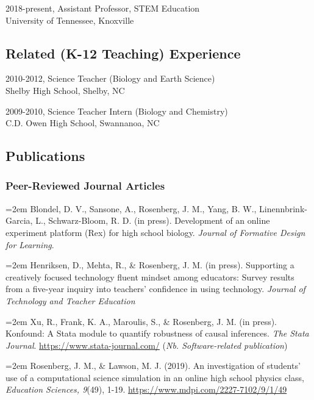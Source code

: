 \documentclass[14,]{article}
\begin{document}
2018-present, Assistant Professor, STEM Education\\
University of Tennessee, Knoxville

\hypertarget{related-k-12-teaching-experience}{%
\subsection{Related (K-12 Teaching)
Experience}\label{related-k-12-teaching-experience}}

2010-2012, Science Teacher (Biology and Earth Science)\\
Shelby High School, Shelby, NC

2009-2010, Science Teacher Intern (Biology and Chemistry)\\
C.D. Owen High School, Swannanoa, NC

\hypertarget{publications}{%
\subsection{Publications}\label{publications}}

\hypertarget{peer-reviewed-journal-articles}{%
\subsubsection{Peer-Reviewed Journal
Articles}\label{peer-reviewed-journal-articles}}

\hangindent=2em Blondel, D. V., Sansone, A., Rosenberg, J. M., Yang, B.
W., Linennbrink-Garcia, L., Schwarz-Bloom, R. D. (in press). Development
of an online experiment platform (Rex) for high school biology.
\emph{Journal of Formative Design for Learning}.

\hangindent=2em Henriksen, D., Mehta, R., \& Rosenberg, J. M. (in
press). Supporting a creatively focused technology fluent mindset among
educators: Survey results from a five-year inquiry into teachers'
confidence in using technology. \emph{Journal of Technology and Teacher
Education}

\hangindent=2em Xu, R., Frank, K. A., Maroulis, S., \& Rosenberg, J. M.
(in press). Konfound: A Stata module to quantify robustness of causal
inferences. \emph{The Stata Journal}.
\url{https://www.stata-journal.com/} (\emph{Nb. Software-related
publication})

\hangindent=2em Rosenberg, J. M., \& Lawson, M. J. (2019). An
investigation of students' use of a computational science simulation in
an online high school physics class, \emph{Education Sciences, 9}(49),
1-19. \url{https://www.mdpi.com/2227-7102/9/1/49}
\end{document}
